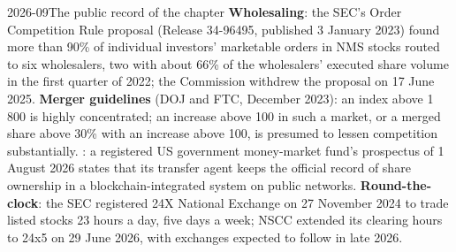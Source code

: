 \begin{omfigure}
\par
{}\label{fig:fm:competition-and-the-future:bounds}
\end{omfigure}

\begin{dated}{2026-09}{The public record of the chapter}\label{dat:fm:competition-and-the-future:record}
\textbf{Wholesaling}: the SEC's Order Competition Rule proposal (Release 34-96495, published 3 January 2023) found more than 90\% of individual
investors' marketable orders in NMS stocks routed to six wholesalers, two with about 66\% of the wholesalers' executed share volume in the first
quarter of 2022; the Commission withdrew the proposal on 17 June 2025. \textbf{Merger guidelines} (DOJ and FTC, December 2023): an index above 1\,800 is
highly concentrated; an increase above 100 in such a market, or a merged share above 30\% with an increase above 100, is presumed to lessen
competition substantially. \textbf{}: a registered US government money-market fund's prospectus of 1 August 2026 states that its
transfer agent keeps the official record of share ownership in a blockchain-integrated system on public networks. \textbf{Round-the-clock}: the SEC
registered 24X National Exchange on 27 November 2024 to trade listed stocks 23 hours a day, five days a week; NSCC extended its clearing hours to
24x5 on 29 June 2026, with exchanges expected to follow in late 2026.
\end{dated}

